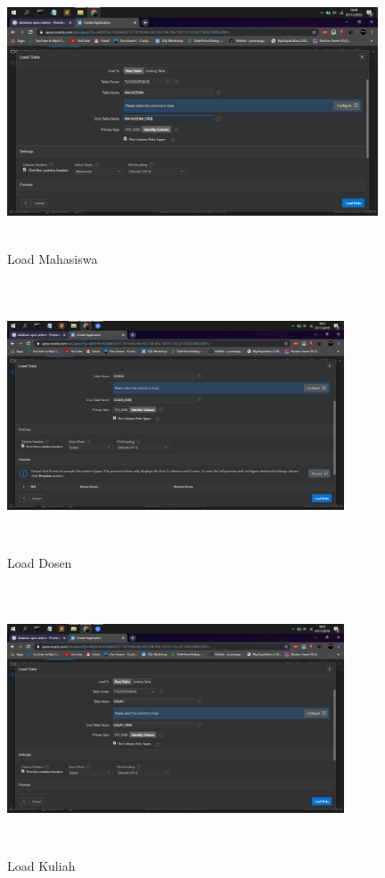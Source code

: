 \begin{enumerate}
\begin{figure}[!htbp]
\centering
\includegraphics[width=11cm,height=8cm]{figures/3.png}
\caption{Load Mahasiswa}
\label{penanda}
\end{figure}

\begin{figure}[!htbp]
\centering
\includegraphics[width=10cm,height=8cm]{figures/4.png}
\caption{Load Dosen}
\label{penanda}
\end{figure}

\begin{figure}[!htbp]
\centering
\includegraphics[width=10cm,height=8cm]{figures/5.png}
\caption{Load Kuliah}
\label{penanda}
\end{figure}


\end{enumerate}
